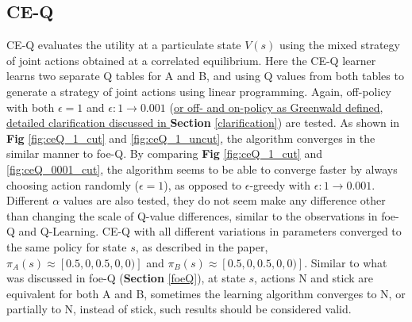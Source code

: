 \documentclass[10pt]{article}
\begin{document}

\subsection{CE-Q} \label{ceQ}
CE-Q evaluates the utility at a particulate state $V(s)$ using the mixed strategy of joint actions obtained at a correlated equilibrium. Here the CE-Q learner learns two separate Q tables for A and B, and using Q values from both tables to generate a strategy of joint actions using linear programming. Again, off-policy with both $\epsilon=1$ and $\epsilon:1\rightarrow0.001$ (\ul{or off- and on-policy as Greenwald defined, detailed clarification discussed in }\textbf{Section} \ref{clarification})\cite{GreenwaldCorrelatedQLearning2005} are tested. As shown in \textbf{Fig} \ref{fig:ceQ_1_cut} and \ref{fig:ceQ_1_uncut}, the algorithm converges in the similar manner to foe-Q. By comparing \textbf{Fig} \ref{fig:ceQ_1_cut} and \ref{fig:ceQ_0001_cut}, the algorithm seems to be able to converge faster by always choosing action randomly ($\epsilon=1$), as opposed to $\epsilon$-greedy with $\epsilon:1\rightarrow0.001$. Different $\alpha$ values are also tested, they do not seem make any difference other than changing the scale of Q-value differences, similar to the observations in foe-Q and Q-Learning. CE-Q with all different variations in parameters converged to the same policy for state $s$, as described in the paper\cite{GreenwaldCorrelatedQLearning2003}, $\pi_A(s)\approx[0.5,0,0.5,0,0)]$ and $\pi_B(s)\approx[0.5,0,0.5,0,0)]$. Similar to what was discussed in foe-Q (\textbf{Section} \ref{foeQ}), at state $s$, actions N and stick are equivalent for both A and B, sometimes the learning algorithm converges to N, or partially to N, instead of stick, such results should be considered valid.
\end{document}
